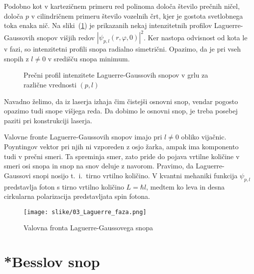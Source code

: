Podobno kot v kartezičnem primeru red polinoma določa število prečnih ničel,
določa $p$ v cilindričnem primeru število vozelnih črt, kjer je gostota 
svetlobnega toka enaka nič. Na sliki~(\ref{fig:Laguerrovi_presek})
je prikazanih nekaj intenzitetnih profilov Laguerre-Gaussovih snopov
višjih redov $|\psi_{p,l}(r, \varphi, 0)|^2$. Ker nastopa  odvisnost od kota
le v fazi, so intenzitetni profili snopa radialno simetrični. Opazimo, da je pri  
vseh snopih z $l \ne 0$ v središču snopa minimum. 
\begin{figure}[h]
\centering
\def\svgwidth{110truemm} 

\caption{Prečni profil intenzitete Laguerre-Gaussovih snopov v grlu 
za različne vrednosti $(p,l)$}
\label{fig:Laguerrovi_presek}
\end{figure}

Navadno želimo, da iz laserja izhaja čim čistejši osnovni snop, vendar
pogosto opazimo tudi snope višjega reda. Da dobimo le osnovni
snop, je treba posebej paziti pri konstrukciji laserja.

\begin{remark}
Valovne fronte Laguerre-Gaussovih snopov imajo pri $l\ne0$  obliko vijačnic. 
Poyntingov vektor 
pri njih ni vzporeden z osjo žarka, ampak ima komponento tudi v prečni smeri. Ta spreminja smer, 
zato pride do pojava vrtilne količine v smeri osi snopa in snop na snov deluje z navorom. 
Pravimo, da Laguerre-Gaussovi snopi nosijo t.\ i.\ tirno vrtilno količino. 
V kvantni mehaniki funkcija $\psi_{p,l}$ predstavlja foton s tirno vrtilno količino $L = \hbar l$, 
medtem ko leva in desna cirkularna polarizacija predstavljata spin fotona. 
\begin{figure}[h]
\centering
\texttt{[image: slike/03\_Laguerre\_faza.png]}
\caption{Valovna fronta Laguerre-Gaussovega snopa}
\label{fig:Laguerrova_fronta}
\end{figure}
\end{remark}

\section{*Besslov snop}

